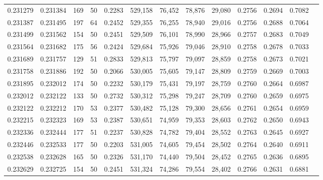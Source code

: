 \begin{tabular}{rrrrrrrrrrrrr}
0.231279 & 0.231384 &   169 &  50 &                                     0.2283 & 529,158 &  76,452 &  78,876 &  29,080 & 0.2756 & 0.2694 & 0.7082 \\
0.231387 & 0.231495 &   197 &  64 &                                     0.2452 & 529,355 &  76,255 &  78,940 &  29,016 & 0.2756 & 0.2688 & 0.7064 \\
0.231499 & 0.231562 &   154 &  50 &                                     0.2451 & 529,509 &  76,101 &  78,990 &  28,966 & 0.2757 & 0.2683 & 0.7049 \\
0.231564 & 0.231682 &   175 &  56 &                                     0.2424 & 529,684 &  75,926 &  79,046 &  28,910 & 0.2758 & 0.2678 & 0.7033 \\
0.231689 & 0.231757 &   129 &  51 &                                     0.2833 & 529,813 &  75,797 &  79,097 &  28,859 & 0.2758 & 0.2673 & 0.7021 \\
0.231758 & 0.231886 &   192 &  50 &                                     0.2066 & 530,005 &  75,605 &  79,147 &  28,809 & 0.2759 & 0.2669 & 0.7003 \\
0.231895 & 0.232012 &   174 &  50 &                                     0.2232 & 530,179 &  75,431 &  79,197 &  28,759 & 0.2760 & 0.2664 & 0.6987 \\
0.232012 & 0.232122 &   133 &  50 &                                     0.2732 & 530,312 &  75,298 &  79,247 &  28,709 & 0.2760 & 0.2659 & 0.6975 \\
0.232122 & 0.232212 &   170 &  53 &                                     0.2377 & 530,482 &  75,128 &  79,300 &  28,656 & 0.2761 & 0.2654 & 0.6959 \\
0.232215 & 0.232323 &   169 &  53 &                                     0.2387 & 530,651 &  74,959 &  79,353 &  28,603 & 0.2762 & 0.2650 & 0.6943 \\
0.232336 & 0.232444 &   177 &  51 &                                     0.2237 & 530,828 &  74,782 &  79,404 &  28,552 & 0.2763 & 0.2645 & 0.6927 \\
0.232446 & 0.232533 &   177 &  50 &                                     0.2203 & 531,005 &  74,605 &  79,454 &  28,502 & 0.2764 & 0.2640 & 0.6911 \\
0.232538 & 0.232628 &   165 &  50 &                                     0.2326 & 531,170 &  74,440 &  79,504 &  28,452 & 0.2765 & 0.2636 & 0.6895 \\
0.232629 & 0.232725 &   154 &  50 &                                     0.2451 & 531,324 &  74,286 &  79,554 &  28,402 & 0.2766 & 0.2631 & 0.6881 \\

\end{tabular}
